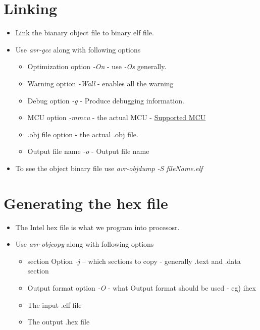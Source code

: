 \section{Linking}
\begin{itemize}
    \item Link the bianary object file to binary elf file.
    \item Use \emph{avr-gcc} along with following options
    \begin{itemize}
        \item Optimization option \emph{-On} - use \emph{-Os} generally.
        \item Warning option \emph{-Wall} - enables all the warning
        \item Debug option \emph{-g} - Produce debugging information.
        \item MCU option \emph{-mmcu} - the actual MCU - \href{https://www.nongnu.org/avr-libc/user-manual/#supp_devices}{Supported MCU}
        \item .obj file option - the actual .obj file.
        \item Output file name \emph{-o} - Output file name

    \end{itemize}
    \item To see the object binary file use \emph{avr-objdump -S fileName.elf}
\end{itemize}

\section{Generating the hex file}
\begin{itemize}
    \item The Intel hex file is what we program into procesosr.
    \item Use \emph{avr-objcopy} along with following options
    \begin{itemize}
        \item section Option \emph{-j} -- which sections to copy - generally .text and .data section
        \item Output format option \emph{-O} - what Output format should be used - eg) ihex
        \item The input .elf file
        \item The output .hex file
    \end{itemize}

\end{itemize}


